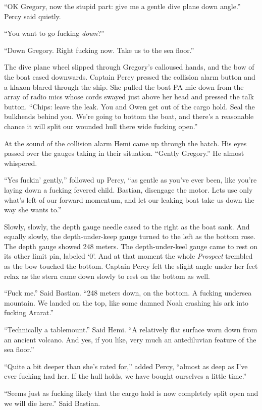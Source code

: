 \documentclass[]{article}
\begin{document}
\begin{multicols}{2}
``OK Gregory, now the stupid part: give me a gentle dive plane down
angle.'' Percy said quietly.

``You want to go fucking \emph{down}?''

``Down Gregory. Right fucking now. Take us to the sea floor.''

The dive plane wheel slipped through Gregory's calloused hands, and the
bow of the boat eased downwards. Captain Percy pressed the collision
alarm button and a klaxon blared through the ship. She pulled the boat
PA mic down from the array of radio mics whose cords swayed just above
her head and pressed the talk button. ``Chips: leave the leak. You and
Owen get out of the cargo hold. Seal the bulkheads behind you. We're
going to bottom the boat, and there's a reasonable chance it will split
our wounded hull there wide fucking open.''

At the sound of the collision alarm Hemi came up through the hatch. His
eyes passed over the gauges taking in their situation. ``Gently
Gregory.'' He almost whispered.

``Yes fuckin' gently,'' followed up Percy, ``as gentle as you've ever
been, like you're laying down a fucking fevered child. Bastian,
disengage the motor. Lets use only what's left of our forward momentum,
and let our leaking boat take us down the way she wants to.''

Slowly, slowly, the depth gauge needle eased to the right as the boat
sank. And equally slowly, the depth-under-keep gauge turned to the left
as the bottom rose. The depth gauge showed 248 meters. The
depth-under-keel gauge came to rest on its other limit pin, labeled `0'.
And at that moment the whole \emph{Prospect} trembled as the bow touched
the bottom. Captain Percy felt the slight angle under her feet relax as
the stern came down slowly to rest on the bottom as well.

``Fuck me.'' Said Bastian. ``248 meters down, on the bottom. A fucking
undersea mountain. We landed on the top, like some damned Noah crashing
his ark into fucking Ararat.''

``Technically a tablemount.'' Said Hemi. ``A relatively flat surface
worn down from an ancient volcano. And yes, if you like, very much an
antediluvian feature of the sea floor.''

``Quite a bit deeper than she's rated for,'' added Percy, ``almost as
deep as I've ever fucking had her. If the hull holds, we have bought
ourselves a little time.''

``Seems just as fucking likely that the cargo hold is now completely
split open and we will die here.'' Said Bastian.


\end{multicols}
\end{document}

